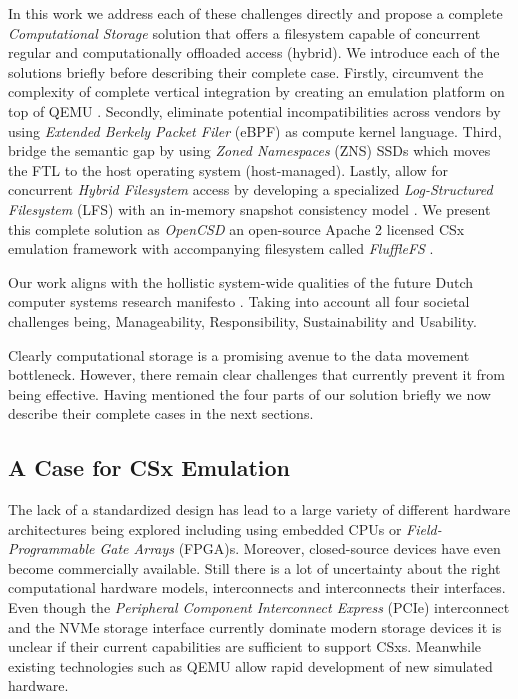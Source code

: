 
In this work we address each of these challenges directly and propose a
complete \textit{Computational Storage} solution that offers a filesystem
capable of concurrent regular and computationally offloaded access (hybrid).
We introduce each of the solutions briefly before describing their complete
case. Firstly, circumvent the complexity of complete vertical integration by
creating an emulation platform on top of QEMU \cite{qemu}. Secondly, eliminate
potential incompatibilities across vendors by using \textit{Extended Berkely
Packet Filer} (eBPF) \cite{what-ebpf} as compute kernel language. Third, bridge
the semantic gap by using \textit{Zoned Namespaces} (ZNS) \cite{zns} SSDs which
moves the FTL to the host operating system (host-managed). Lastly, allow for
concurrent \textit{Hybrid Filesystem} access by developing a specialized
\textit{Log-Structured Filesystem} (LFS) \cite{Rosenblum1992TheDA} with an
in-memory snapshot consistency model \cite{Viotti2016ConsistencyIN}. We present
this complete solution as \textit{OpenCSD} an open-source Apache 2 licensed CSx
emulation framework with accompanying filesystem called \textit{FluffleFS}
\cite{qemu-csd}.

Our work aligns with the hollistic system-wide qualities of the future Dutch
computer systems research manifesto
\cite{Iosup2018MassivizingCS, Iosup2022FutureCS}. Taking into account all four
societal challenges being, Manageability, Responsibility, Sustainability and
Usability.

Clearly computational storage is a promising avenue to the data movement
bottleneck. However, there remain clear challenges that currently prevent it
from being effective. Having mentioned the four parts of our solution briefly we
now describe their complete cases in the next sections.

\subsection{A Case for CSx Emulation}

The lack of a standardized design has lead to a large variety of different
hardware architectures being explored including using embedded CPUs or
\textit{Field-Programmable Gate Arrays} (FPGA)s. Moreover, closed-source
devices have even become commercially available. Still there is a lot of
uncertainty about the right computational hardware models, interconnects and
interconnects their interfaces. Even though the \textit{Peripheral Component
Interconnect Express} (PCIe) interconnect and the NVMe storage interface
currently dominate modern storage devices it is unclear if their current
capabilities are sufficient to support CSxs. Meanwhile existing technologies
such as QEMU allow rapid development of new simulated hardware.

